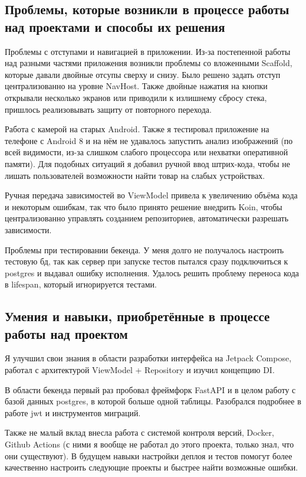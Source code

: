 \documentclass[14pt,a4paper]{extarticle}
\begin{document}
\subsection{Проблемы, которые возникли в процессе работы над проектами и способы их решения}
Проблемы с отступами и навигацией в приложении.
Из-за постепенной работы над разными частями приложения возникли проблемы со вложенными Scaffold, которые давали двойные отсупы сверху и снизу. Было решено задать отступ централизованно на уровне NavHost. Также двойные нажатия на кнопки открывали несколько экранов или приводили к излишнему сбросу стека, пришлось реализовывать защиту от повторного перехода.

Работа с камерой на старых Android.
Также я тестировал приложение на телефоне с Android 8 и на нём не удавалось запустить анализ изображений (по всей видимости, из-за слишком слабого процессора или нехватки оперативной памяти). Для подобных ситуаций я добавил ручной ввод штрих-кода, чтобы не лишать пользователей возможности найти товар на слабых устройствах.

Ручная передача зависимостей во ViewModel привела к увеличению объёма кода и некоторым ошибкам, так что было принято решение внедрить Koin, чтобы централизованно управлять созданием репозиториев, автоматически разрешать зависимости.

Проблемы при тестировании бекенда.
У меня долго не получалось настроить тестовую бд, так как сервер при запуске тестов пытался сразу подключиться к postgres и выдавал ошибку исполнения. Удалось решить проблему переноса кода в lifespan, который игнорируется тестами.

\subsection{Умения и навыки, приобретённые в процессе работы над проектом}
Я улучшил свои знания в области разработки интерфейса на Jetpack Compose, работал с архитектурой ViewModel + Repository и изучил концепцию DI.

В области бекенда первый раз пробовал фреймфорк FastAPI и в целом работу с базой данных postgres, в которой больше одной таблицы. Разобрался подробнее в работе jwt и инструментов миграций.

Также не малый вклад внесла работа с системой контроля версий, Docker, Github Actions (с ними я вообще не работал до этого проекта, только знал, что они существуют). В будущем навыки настройки деплоя и тестов помогут более качественно настроить следующие проекты и быстрее найти возможные ошибки.
\end{document}
